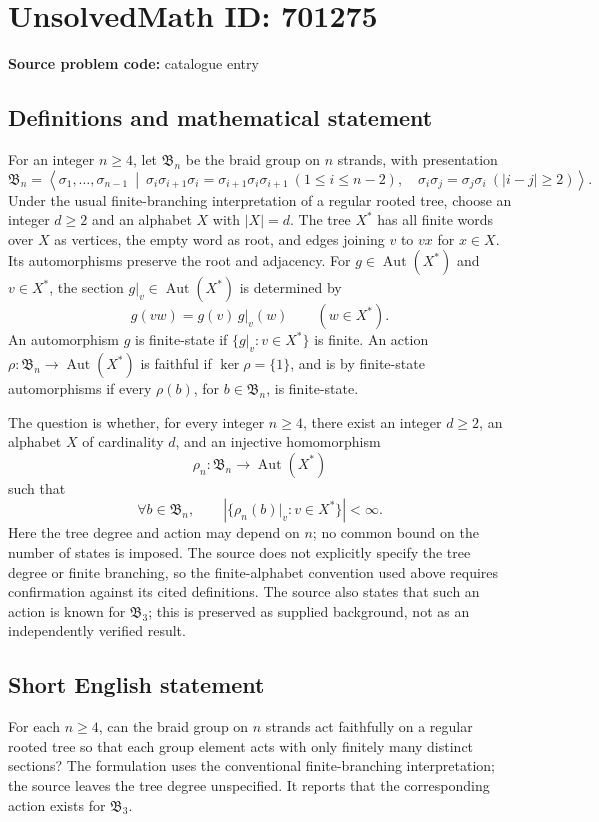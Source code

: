 \documentclass[11pt]{article}
\begin{document}
\section*{UnsolvedMath ID: 701275}
\textbf{Source problem code:} catalogue entry
\subsection{Definitions and mathematical statement}
For an integer \(n\geq 4\), let \(\mathfrak B_n\) be the braid group on \(n\) strands, with presentation
\[
\mathfrak B_n=\left\langle \sigma_1,\ldots,\sigma_{n-1}\ \middle|\ \sigma_i\sigma_{i+1}\sigma_i=\sigma_{i+1}\sigma_i\sigma_{i+1}\ (1\leq i\leq n-2),\quad \sigma_i\sigma_j=\sigma_j\sigma_i\ (|i-j|\geq2)\right\rangle.
\]
Under the usual finite-branching interpretation of a regular rooted tree, choose an integer \(d\geq2\) and an alphabet \(X\) with \(|X|=d\). The tree \(X^*\) has all finite words over \(X\) as vertices, the empty word as root, and edges joining \(v\) to \(vx\) for \(x\in X\). Its automorphisms preserve the root and adjacency. For \(g\in\operatorname{Aut}(X^*)\) and \(v\in X^*\), the section \(g|_v\in\operatorname{Aut}(X^*)\) is determined by
\[
 g(vw)=g(v)\,g|_v(w)\qquad(w\in X^*).
\]
An automorphism \(g\) is finite-state if \(\{g|_v:v\in X^*\}\) is finite. An action \(\rho:\mathfrak B_n\to\operatorname{Aut}(X^*)\) is faithful if \(\ker\rho=\{1\}\), and is by finite-state automorphisms if every \(\rho(b)\), for \(b\in\mathfrak B_n\), is finite-state.

The question is whether, for every integer \(n\geq4\), there exist an integer \(d\geq2\), an alphabet \(X\) of cardinality \(d\), and an injective homomorphism
\[
 \rho_n:\mathfrak B_n\longrightarrow\operatorname{Aut}(X^*)
\]
such that
\[
 \forall b\in\mathfrak B_n,\qquad
 \left|\{\rho_n(b)|_v:v\in X^*\}\right|<\infty.
\]
Here the tree degree and action may depend on \(n\); no common bound on the number of states is imposed. The source does not explicitly specify the tree degree or finite branching, so the finite-alphabet convention used above requires confirmation against its cited definitions. The source also states that such an action is known for \(\mathfrak B_3\); this is preserved as supplied background, not as an independently verified result.
\subsection{Short English statement}
For each \(n\geq4\), can the braid group on \(n\) strands act faithfully on a regular rooted tree so that each group element acts with only finitely many distinct sections? The formulation uses the conventional finite-branching interpretation; the source leaves the tree degree unspecified. It reports that the corresponding action exists for \(\mathfrak B_3\).
\end{document}

